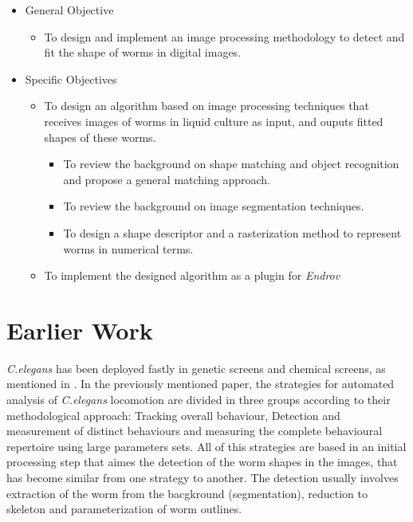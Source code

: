 \begin{itemize}
\item General Objective
  \begin{itemize}
  \item To design and implement an image processing methodology to detect
    and fit the shape of worms in digital images.    
  \end{itemize}
\end{itemize}
\begin{itemize}
\item Specific Objectives
  \begin{itemize}
  \item To design an algorithm based on image processing techniques that
    receives images of worms in liquid culture as input, and ouputs
    fitted shapes of these worms.
    \begin{itemize}
    \item To review the background on shape matching and object recognition and
      propose a general matching approach.
    \item To review the background on image segmentation techniques.
    \item To design a shape descriptor and a rasterization method to
      represent worms in numerical terms.
    \end{itemize}
  \item To implement the designed algorithm as a plugin for \emph{Endrov}
  \end{itemize}
\end{itemize}

\section{Earlier Work}

\emph{C.elegans} has been deployed fastly in genetic screens and chemical
screens, as mentioned in \cite{automated}. In the previously mentioned paper,
the strategies for automated analysis of \emph{C.elegans} locomotion are
divided in three groups according to their methodological approach:
Tracking overall behaviour, Detection and measurement of distinct behaviours and
measuring the complete behavioural repertoire using large parameters sets.
All of this strategies are based in an initial processing step that aimes 
the detection of the worm shapes in the images, that has become similar
from one strategy to another. The detection usually involves extraction
of the worm from the bacgkround (segmentation), reduction to
skeleton and parameterization of worm outlines.\\

